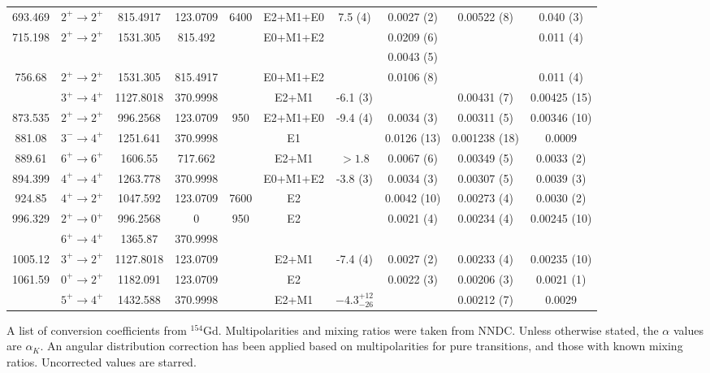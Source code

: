 \begin{landscape}
\begin{longtable}{c|c|c|c|c|c|c|c|c|c}
693.469	&	$2^+	\rightarrow	2^+$	&	815.4917	&	123.0709	&	6400	&	E2+M1+E0	&	7.5 (4)	&	0.0027	(2)	&	0.00522 (8)	&	0.040 (3)	\\
715.198	&	$2^+	\rightarrow	2^+$	&	1531.305	&	815.492	&		&	E0+M1+E2	&		&	0.0209	(6)	&		&	0.011 (4)	\\
	&				&		&		&		&		&		&	0.0043	(5)	&		&		\\
756.68	&	$2^+	\rightarrow	2^+$	&	1531.305	&	815.4917	&		&	E0+M1+E2	&		&	0.0106	(8)	&		&	0.011 (4)	\\
	&	$3^+	\rightarrow	4^+$	&	1127.8018	&	370.9998	&		&	E2+M1	&	-6.1 (3)	&					&	0.00431 (7)	&	0.00425 (15)	\\
873.535	&	$2^+	\rightarrow	2^+$	&	996.2568	&	123.0709	&	950	&	E2+M1+E0	&	-9.4 (4)	&	0.0034	(3)	&	0.00311 (5)	&	0.00346 (10)	\\
881.08	&	$3^-	\rightarrow	4^+$	&	1251.641	&	370.9998	&		&	E1	&		&	0.0126	(13)	&	0.001238 (18)	&	0.0009	\\
889.61	&	$6^+	\rightarrow	6^+$	&	1606.55	&	717.662	&		&	E2+M1	&	$>1.8$	&	0.0067	(6)	&	0.00349 (5)	&	0.0033 (2)	\\
894.399	&	$4^+	\rightarrow	4^+$	&	1263.778	&	370.9998	&		&	E0+M1+E2	&	-3.8 (3)	&	0.0034	(3)	&	0.00307 (5)	&	0.0039 (3)	\\
924.85	&	$4^+	\rightarrow	2^+$	&	1047.592	&	123.0709	&	7600	&	E2	&		&	0.0042	(10)	&	0.00273 (4)	&	0.0030 (2)	\\
996.329	&	$2^+	\rightarrow	0^+$	&	996.2568	&	0	&	950	&	E2	&		&	0.0021	(4)	&	0.00234 (4)	&	0.00245 (10)	\\
	&	$6^+	\rightarrow	4^+$	&	1365.87	&	370.9998	&		&		&		&					&		&		\\
1005.12	&	$3^+	\rightarrow	2^+$	&	1127.8018	&	123.0709	&		&	E2+M1	&	-7.4 (4)	&	0.0027	(2)	&	0.00233 (4)	&	0.00235 (10)	\\
1061.59	&	$0^+	\rightarrow	2^+$	&	1182.091	&	123.0709	&		&	E2	&		&	0.0022	(3)	&	0.00206 (3)	&	0.0021 (1)	\\
	&	$5^+	\rightarrow	4^+$	&	1432.588	&	370.9998	&		&	E2+M1	&	$-4.3^{+12}_{-26}$	&					&	0.00212 (7)	&	0.0029	\\
 \bottomrule
    \end{longtable}
    \caption{A list of conversion coefficients from $^{154}$Gd. Multipolarities and mixing ratios were taken from NNDC. Unless otherwise stated, the $\alpha$ values are $\alpha_K$. An angular distribution correction has been applied based on multipolarities for pure transitions, and those with known mixing ratios. Uncorrected values are starred.}
\end{landscape}

